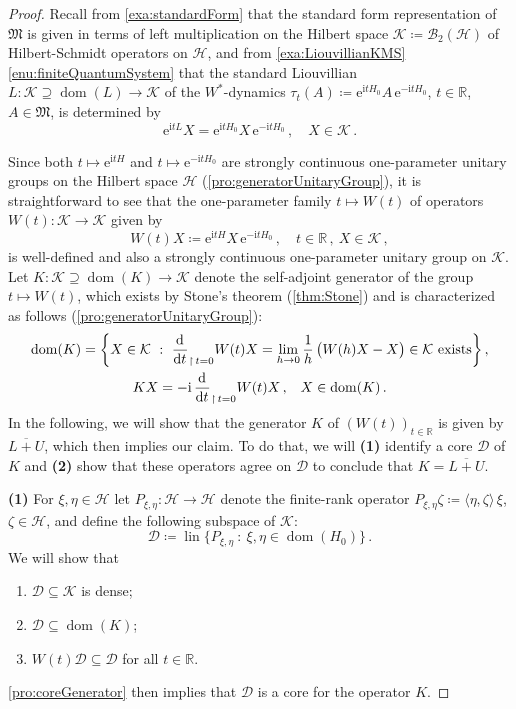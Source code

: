\documentclass[a4paper, twoside, 11pt, reqno]{amsart}
\theoremstyle{definition}
\theoremstyle{plain}
\renewcommand{\subset}{\subseteq}
\renewcommand{\supset}{\supseteq}
\let\originalleft\left
\let\originalright\right
\renewcommand{\left}{\mathopen{}\mathclose\bgroup\originalleft}
\renewcommand{\right}{\aftergroup\egroup\originalright}
\newcommand{\R}{\mathbb{R}}
\newcommand{\MD}{\mathcal{D}}
\newcommand{\MH}{\mathcal{H}}
\newcommand{\MK}{\mathcal{K}}
\newcommand{\MFM}{\mathfrak{M}}
\newcommand{\ii}{\mathrm{i}}
\newcommand{\ee}{\mathrm{e}}
\newcommand{\BO}{\mathscr{B}}
\newcommand{\HS}{\BO_2}
\newcommand{\1}{\mathbf{1}}
\newcommand{\diff}{\mathop{}\!\mathrm{d}}
\DeclareMathOperator{\dom}{dom}
\DeclareMathOperator{\lin}{lin}
\newcommand{\set}[2][]{#1\{{#2}#1\}}
\newcommand{\Set}[1]{\left\{#1\right\}}
\newcommand{\braket}[2][]{#1\langle{#2}#1\rangle}
\newcommand{\odbound}[4][]{\frac{\diff^{#1} #2}{\diff {#3}^{#1}}_{\upharpoonright \, #4}}
\newcommand{\ce}{\coloneqq}
\newcommand{\oln}[1]{\overline{#1}}
\newcommand{\com}{{\, , \quad}}
\begin{document}
\begin{proof}
    Recall from \cref{exa:standardForm} that the standard form representation of $\MFM$ is given in terms of left multiplication on the Hilbert space $\MK \ce \HS(\MH)$ of Hilbert-Schmidt operators on $\MH$, and from \cref{exa:LiouvillianKMS} \ref{enu:finiteQuantumSystem} that the standard Liouvillian $L : \MK \supset \dom(L) \to \MK$ of the $W^\ast$-dynamics $\tau_t(A) \ce \ee^{\ii t H_0} A \, \ee^{- \ii t H_0}$, $t \in \R$, $A \in \MFM$, is determined by
    \begin{equation}\label{eq:LiouvillianFQS}
        \ee^{\ii t L} X = \ee^{\ii t H_0} X \, \ee^{- \ii t H_0} \com X \in \MK \, .
    \end{equation}

    Since both $t \mapsto \ee^{\ii t H}$ and $t \mapsto \ee^{- \ii t H_0}$ are strongly continuous one-parameter unitary groups on the Hilbert space $\MH$ (\cref{pro:generatorUnitaryGroup}), it is straightforward to see that the one-parameter family $t \mapsto W(t)$ of operators $W(t) : \MK \to \MK$ given by
    \begin{equation*}
        W(t) X \ce \ee^{\ii t H} X \, \ee^{- \ii t H_0} \com t \in \R \, , \ X \in \MK \, ,
    \end{equation*}
    is well-defined and also a strongly continuous one-parameter unitary group on $\MK$. Let $K : \MK \supset \dom(K) \to \MK$ denote the self-adjoint generator of the group $t \mapsto W(t)$, which exists by Stone's theorem (\cref{thm:Stone}) and is characterized as follows (\cref{pro:generatorUnitaryGroup}):
    \begin{gather*}
        \dom(K) = \Set{X \in \MK \ : \ \odbound{}{t}{t=0} W(t) X = \lim_{h \to 0} \frac{1}{h} \, \bigl(W(h) X - X\bigr) \in \MK \ \text{exists}} \, , \\
        K X = - \ii \, \odbound{}{t}{t=0} W(t) X \com X \in \dom(K) \, .
    \end{gather*}
    In the following, we will show that the generator $K$ of $(W(t))_{t \in \R}$ is given by $\oln{L + U}$, which then implies our claim. To do that, we will \textbf{(1)} identify a core $\MD$ of $K$ and \textbf{(2)} show that these operators agree on $\MD$ to conclude that $K = \oln{L + U}$.

    \textbf{(1)} For $\xi, \eta \in \MH$ let $P_{\xi, \eta} : \MH \to \MH$ denote the finite-rank operator $P_{\xi, \eta} \zeta \ce \braket{\eta, \zeta} \, \xi$, $\zeta \in \MH$, and define the following subspace of $\MK$:
    \begin{equation*}
        \MD \ce \lin \set[\big]{P_{\xi, \eta} \ : \ \xi, \eta \in \dom(H_0)} \, .
    \end{equation*}
    We will show that
    \begin{enumerate}
        \item $\MD \subset \MK$ is dense;
        \item $\MD \subset \dom(K)$;
        \item $W(t) \MD \subset \MD$ for all $t \in \R$.
    \end{enumerate}
    \cref{pro:coreGenerator} then implies that $\MD$ is a core for the operator $K$. 


\end{proof}
\end{document}

